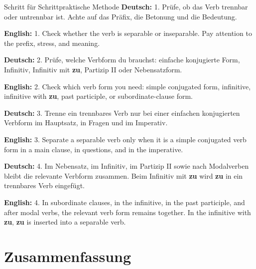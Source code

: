 \documentclass[a4paper,11pt]{article}
\newcommand{\GermanText}[1]{\textbf{Deutsch: }#1\par}
\newcommand{\EnglishText}[1]{{\small\color{SoftGray}\textbf{English: }#1\par}}
\begin{document}
        \begin{grammarentry}{Schritt für Schritt}{praktische Methode}
            \GermanText{1. Prüfe, ob das Verb trennbar oder untrennbar ist. Achte auf das Präfix, die Betonung und die Bedeutung.}
            \EnglishText{1. Check whether the verb is separable or inseparable. Pay attention to the prefix, stress, and meaning.}

            \GermanText{2. Prüfe, welche Verbform du brauchst: einfache konjugierte Form, Infinitiv, Infinitiv mit \textbf{zu}, Partizip II oder Nebensatzform.}
            \EnglishText{2. Check which verb form you need: simple conjugated form, infinitive, infinitive with \textbf{zu}, past participle, or subordinate-clause form.}

            \GermanText{3. Trenne ein trennbares Verb nur bei einer einfachen konjugierten Verbform im Hauptsatz, in Fragen und im Imperativ.}
            \EnglishText{3. Separate a separable verb only when it is a simple conjugated verb form in a main clause, in questions, and in the imperative.}

            \GermanText{4. Im Nebensatz, im Infinitiv, im Partizip II sowie nach Modalverben bleibt die relevante Verbform zusammen. Beim Infinitiv mit \textbf{zu} wird \textbf{zu} in ein trennbares Verb eingefügt.}
            \EnglishText{4. In subordinate clauses, in the infinitive, in the past participle, and after modal verbs, the relevant verb form remains together. In the infinitive with \textbf{zu}, \textbf{zu} is inserted into a separable verb.}
        \end{grammarentry}


    \section{Zusammenfassung}
\end{document}
